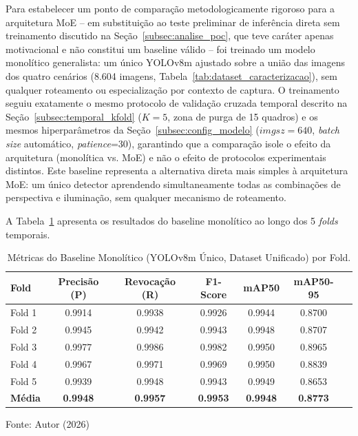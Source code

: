 \documentclass[12pt,fleqn]{article}
\begin{document}
Para estabelecer um ponto de comparação metodologicamente rigoroso para a arquitetura MoE -- em substituição ao teste preliminar de inferência direta sem treinamento discutido na Seção~\ref{subsec:analise_poc}, que teve caráter apenas motivacional e não constitui um baseline válido -- foi treinado um modelo monolítico generalista: um único YOLOv8m ajustado sobre a união das imagens dos quatro cenários (8.604 imagens, Tabela~\ref{tab:dataset_caracterizacao}), sem qualquer roteamento ou especialização por contexto de captura. O treinamento seguiu exatamente o mesmo protocolo de validação cruzada temporal descrito na Seção~\ref{subsec:temporal_kfold} ($K=5$, zona de purga de 15 quadros) e os mesmos hiperparâmetros da Seção~\ref{subsec:config_modelo} ($imgsz=640$, \textit{batch size} automático, \textit{patience}=30), garantindo que a comparação isole o efeito da arquitetura (monolítica vs. MoE) e não o efeito de protocolos experimentais distintos. Este baseline representa a alternativa direta mais simples à arquitetura MoE: um único detector aprendendo simultaneamente todas as combinações de perspectiva e iluminação, sem qualquer mecanismo de roteamento.

A Tabela~\ref{tab:baseline_overall} apresenta os resultados do baseline monolítico ao longo dos 5 \textit{folds} temporais.

\begin{table}[H]
\caption{Métricas do Baseline Monolítico (YOLOv8m Único, Dataset Unificado) por Fold.}
\label{tab:baseline_overall}
\centering{}
\begin{tabular*}{\textwidth}{@{\extracolsep{\fill}}lcccccc}
\hline
Fold & Precisão (P) & Revocação (R) & F1-Score & mAP50 & mAP50-95 \\
\hline
Fold 1 & 0.9914 & 0.9938 & 0.9926 & 0.9944 & 0.8700 \\
Fold 2 & 0.9945 & 0.9942 & 0.9943 & 0.9948 & 0.8707 \\
Fold 3 & 0.9977 & 0.9986 & 0.9982 & 0.9950 & 0.8965 \\
Fold 4 & 0.9967 & 0.9971 & 0.9969 & 0.9950 & 0.8839 \\
Fold 5 & 0.9939 & 0.9948 & 0.9943 & 0.9949 & 0.8653 \\
\hline
\textbf{Média} & \textbf{0.9948} & \textbf{0.9957} & \textbf{0.9953} & \textbf{0.9948} & \textbf{0.8773} \\
\hline
\end{tabular*}
{\footnotesize\centering Fonte: Autor (2026)\par}
\end{table}
\end{document}

